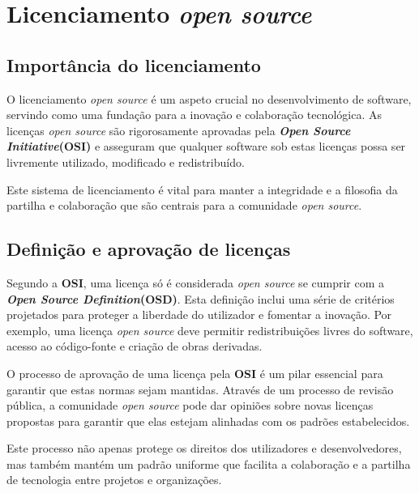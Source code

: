 \section{Licenciamento \textit{open source}} \label{section: licenciamento}
\subsection{Importância do licenciamento}
O licenciamento \textit{open source} é um aspeto crucial no desenvolvimento de software, servindo como uma fundação para a inovação e colaboração tecnológica.
As licenças \textit{open source} são rigorosamente aprovadas pela \textbf{\textit{Open Source Initiative}(OSI)} e asseguram que qualquer software sob estas licenças possa ser livremente utilizado, modificado e redistribuído. \cite{openSourceLicense}
\par \vspace{6pt}
Este sistema de licenciamento é vital para manter a integridade e a filosofia da partilha e colaboração que são centrais para a comunidade \textit{open source}.

\subsection{Definição e aprovação de licenças}
Segundo a \textbf{OSI}, uma licença só é considerada \textit{open source} se cumprir com a \textbf{\textit{Open Source Definition}(OSD)}. Esta definição inclui uma série de critérios projetados para proteger a liberdade do
utilizador e fomentar a inovação. Por exemplo, uma licença \textit{open source} deve permitir redistribuições livres do software, acesso ao código-fonte e criação de obras derivadas.
\par \vspace{6pt}
O processo de aprovação de uma licença pela \textbf{OSI} é um pilar essencial para garantir que estas normas sejam mantidas. Através de um processo de revisão pública, a comunidade \textit{open source} pode dar opiniões 
sobre novas licenças propostas para garantir que elas estejam alinhadas com os padrões estabelecidos. 
\par \vspace{6pt}
Este processo não apenas protege os direitos dos utilizadores e desenvolvedores, mas também mantém um 
padrão uniforme que facilita a colaboração e a partilha de tecnologia entre projetos e organizações.

